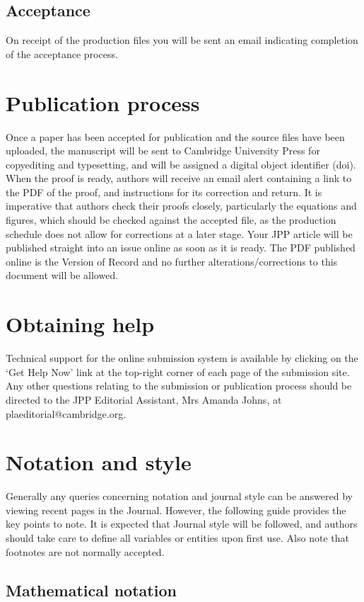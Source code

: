 \documentclass[12pt]{RBM_P}
\begin{document}
\subsection{Acceptance}
On receipt of the production files you will be sent an email indicating completion of the acceptance process.

\section{Publication process}
Once a paper has been accepted for publication and the source files have been uploaded, the manuscript will be sent to Cambridge University Press for copyediting and typesetting, and will be assigned a digital object identifier (doi). When the proof is ready, authors will receive an email alert containing a link to the PDF of the proof, and instructions for its correction and return. It is imperative that authors check their proofs closely, particularly the equations and figures, which should be checked against the accepted file, as the production schedule does not allow for corrections at a later stage. Your JPP article will be published straight into an issue online as soon as it is ready. The PDF published online is the Version of Record and no further alterations/corrections to this document will be allowed.

\section{Obtaining help}
Technical support for the online submission system is available by clicking on the `Get Help Now' link at the top-right corner of each page of the submission site. Any other questions relating to the submission or publication process should be directed to the JPP Editorial Assistant, Mrs Amanda Johns, at plaeditorial@cambridge.org.

\section{Notation and style}\label{notstyle}
Generally any queries concerning notation and journal style can be answered by viewing recent pages in the Journal. However, the following guide provides the key points to note. It is expected that Journal style will be followed, and authors should take care to define all variables or entities upon first use. Also note that footnotes are not normally accepted.

\subsection{Mathematical notation}
\end{document}
